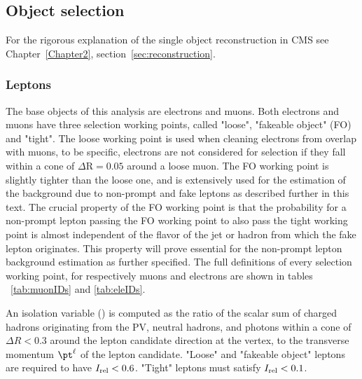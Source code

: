 \subsection{Object selection}\label{sec:object}
For the rigorous explanation of the single object reconstruction in
CMS see Chapter~\ref{Chapter2}, section~\ref{sec:reconstruction}.

\subsubsection{Leptons}
The base objects of this analysis are electrons and muons. Both electrons and muons have three selection working points, called "loose", "fakeable object" (FO) and "tight". The loose working point is used when cleaning electrons from overlap with muons, to be specific, electrons are not considered for selection if they fall within a cone of $\Delta \mathrm{R} = 0.05$ around a loose muon. The FO working point is slightly tighter than the loose one, and is extensively used for the estimation of the background due to non-prompt and fake leptons as described further in this text. The crucial property of the FO working point is that the probability for a non-prompt lepton passing the FO working point to also pass the tight working point is almost independent of the flavor of the jet or hadron from which the fake lepton originates. This property will prove essential for the non-prompt lepton background estimation as further specified. The full definitions of every selection working point, for respectively muons and electrons are shown in tables ~\ref{tab:muonIDs} and \ref{tab:eleIDs}.

An isolation variable (\Irel) is computed as the ratio of the scalar 
\pt sum of charged hadrons originating from the PV, neutral hadrons, and photons within a cone of 
$\Delta R<0.3$ around the lepton candidate direction at the vertex, 
to the transverse momentum $\pt^\ell$ of the lepton candidate. 
"Loose" and "fakeable object" leptons are required to have $I_{\mathrm{rel}} < 0.6$. 
"Tight" leptons must satisfy $I_{\mathrm{rel}} < 0.1$.

